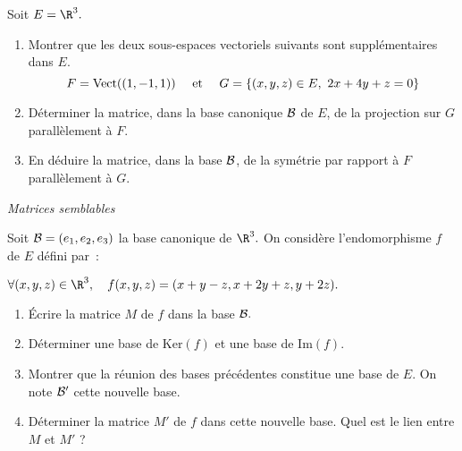 \documentclass[a4paper,10pt]{report}
\begin{document}
\begin{Exa} Soit $E=\R^3.$

\begin{enumerate}

\item Montrer que les deux sous-espaces vectoriels suivants sont
suppl\'ementaires dans $E.$
$$F=\hbox{Vect}((1,-1,1))\quad\hbox{ et }\quad G=\{(x,y,z)\in
E,\ 2x+4y+z=0\}$$

\item D\'eterminer la matrice, dans la base canonique ${\cal B}$
de $E$, de la projection sur $G$ parallèlement à $F.$

\item En d\'eduire la matrice, dans la base ${\cal B}$, de la
sym\'etrie par rapport \`a $F$ parallèlement à $G.$
\end{enumerate}
\end{Exa} 

\medskip

\begin{center}
\textit{{ {\large Matrices semblables}}}
\end{center}

\medskip


\begin{Exa} Soit ${\cal B}=(e_1,e_2,e_3)$ la base canonique de $\R^3.$ On consid\`ere
l'endomorphisme $f$ de $E$ d\'efini par~:

\begin{center}
$\forall (x,y,z)\in\R^3,\quad f(x,y,z)=(x+y-z,x+2y+z,y+2z).$
\end{center}

\begin{enumerate}

\item Écrire la matrice $M$ de $f$ dans la base ${\cal B}.$

\item D\'eterminer une base de $\textrm{Ker}(f)$ et une base de $\textrm{Im}(f)$.

\item Montrer que la r\'eunion des bases pr\'ec\'edentes constitue une base de $E$. On note ${\cal B}'$ cette nouvelle base.

\item  D\'eterminer la matrice $M'$ de $f$ dans cette nouvelle base. Quel est le lien entre $M$ et $M'$ ?
\end{enumerate}

\end{Exa}
\end{document}
